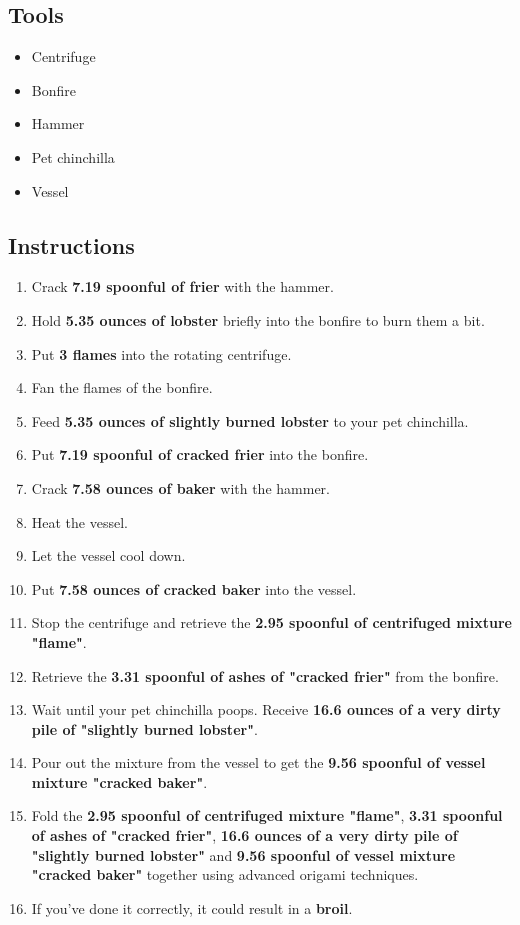 \documentclass{article}
\begin{document}
\subsection{Tools}\begin{itemize}
\item 
Centrifuge
\item 
Bonfire
\item 
Hammer
\item 
Pet chinchilla
\item 
Vessel
\end{itemize}
\subsection{Instructions}\begin{enumerate}
\item 
Crack \textbf{7.19 spoonful of frier} with the hammer.
\item 
Hold \textbf{5.35 ounces of lobster} briefly into the bonfire to burn them a bit.
\item 
Put \textbf{3 flames} into the rotating centrifuge.
\item 
Fan the flames of the bonfire.
\item 
Feed \textbf{5.35 ounces of slightly burned lobster} to your pet chinchilla.
\item 
Put \textbf{7.19 spoonful of cracked frier} into the bonfire.
\item 
Crack \textbf{7.58 ounces of baker} with the hammer.
\item 
Heat the vessel.
\item 
Let the vessel cool down.
\item 
Put \textbf{7.58 ounces of cracked baker} into the vessel.
\item 
Stop the centrifuge and retrieve the \textbf{2.95 spoonful of centrifuged mixture "flame"}.
\item 
Retrieve the \textbf{3.31 spoonful of ashes of "cracked frier"} from the bonfire.
\item 
Wait until your pet chinchilla poops. Receive \textbf{16.6 ounces of a very dirty pile of "slightly burned lobster"}.
\item 
Pour out the mixture from the vessel to get the \textbf{9.56 spoonful of vessel mixture "cracked baker"}.
\item 
Fold the \textbf{2.95 spoonful of centrifuged mixture "flame"}, \textbf{3.31 spoonful of ashes of "cracked frier"}, \textbf{16.6 ounces of a very dirty pile of "slightly burned lobster"} and \textbf{9.56 spoonful of vessel mixture "cracked baker"} together using advanced origami techniques.
\item 
If you've done it correctly, it could result in a \textbf{broil}.
\end{enumerate}
\newpage
\end{document}
